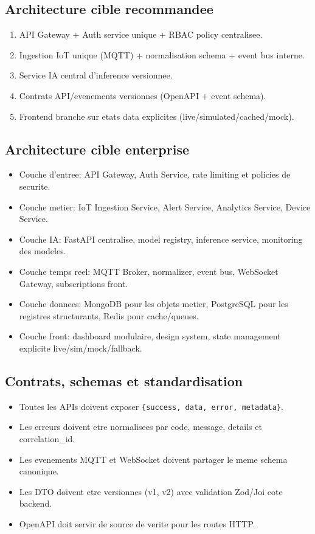 \documentclass[12pt,a4paper]{article}
\begin{document}
\subsection{Architecture cible recommandee}
\begin{enumerate}
  \item API Gateway + Auth service unique + RBAC policy centralisee.
  \item Ingestion IoT unique (MQTT) + normalisation schema + event bus interne.
  \item Service IA central d'inference versionnee.
  \item Contrats API/evenements versionnes (OpenAPI + event schema).
  \item Frontend branche sur etats data explicites (live/simulated/cached/mock).
\end{enumerate}

\subsection{Architecture cible enterprise}
\begin{itemize}
  \item Couche d'entree: API Gateway, Auth Service, rate limiting et policies de securite.
  \item Couche metier: IoT Ingestion Service, Alert Service, Analytics Service, Device Service.
  \item Couche IA: FastAPI centralise, model registry, inference service, monitoring des modeles.
  \item Couche temps reel: MQTT Broker, normalizer, event bus, WebSocket Gateway, subscriptions front.
  \item Couche donnees: MongoDB pour les objets metier, PostgreSQL pour les registres structurants, Redis pour cache/queues.
  \item Couche front: dashboard modulaire, design system, state management explicite live/sim/mock/fallback.
\end{itemize}

\subsection{Contrats, schemas et standardisation}
\begin{itemize}
  \item Toutes les APIs doivent exposer \texttt{\{success, data, error, metadata\}}.
  \item Les erreurs doivent etre normalisees par code, message, details et correlation\_id.
  \item Les evenements MQTT et WebSocket doivent partager le meme schema canonique.
  \item Les DTO doivent etre versionnes (v1, v2) avec validation Zod/Joi cote backend.
  \item OpenAPI doit servir de source de verite pour les routes HTTP.
\end{itemize}
\end{document}
